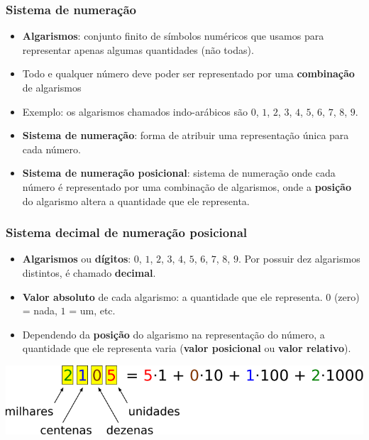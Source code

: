 \documentclass{beamer}
\begin{document}
\begin{frame}
\frametitle{Sistema de numeração}

\begin{itemize}
\item \textbf{Algarismos}: conjunto finito de símbolos numéricos que usamos para representar apenas algumas quantidades (não todas).
\pause
\item Todo e qualquer número deve poder ser representado por uma \textbf{combinação} de algarismos 
\pause
\item Exemplo: os algarismos chamados indo-arábicos são $0$, $1$, $2$, $3$, $4$, $5$, $6$, $7$, $8$, $9$.
\pause
\item \textbf{Sistema de numeração}: forma de atribuir uma representação única para cada número.
\pause
\item \textbf{Sistema de numeração posicional}: sistema de numeração onde cada número é representado por uma combinação de algarismos, onde a \textbf{posição} do algarismo altera a quantidade que ele representa.
\end{itemize}

\end{frame}

\begin{frame}
\frametitle{Sistema decimal de numeração posicional}

\begin{itemize}
\item \textbf{Algarismos} ou \textbf{dígitos}: $0$, $1$, $2$, $3$, $4$, $5$, $6$, $7$, $8$, $9$. Por possuir dez algarismos distintos, é chamado \textbf{decimal}.
\pause
\item \textbf{Valor absoluto} de cada algarismo: a quantidade que ele representa. $0$ (zero) = nada, $1$ = um, etc.
\pause
\item Dependendo da \textbf{posição} do algarismo na representação do número, a quantidade que ele representa varia (\textbf{valor posicional} ou \textbf{valor relativo}).
\end{itemize}

\begin{center}
\includegraphics{images/numero2105}
\end{center}

\end{frame}
\end{document}
